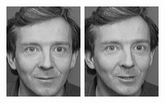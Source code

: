 \begin{figure}[ht]
 \includegraphics[width=\columnwidth/11]{ch3/figures/s3_9.png}
 \includegraphics[width=\columnwidth/11]{ch3/figures/s3_10.png}\\

\end{figure}
